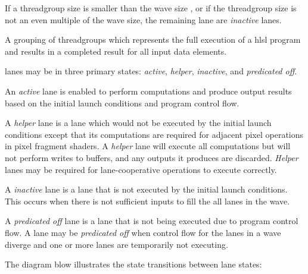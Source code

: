 \p If a \gls{threadgroup} size is smaller than the \gls{wave} size , or if the
\gls{threadgroup} size is not an even multiple of the \gls{wave} size, the
remaining \gls{lane} are \textit{inactive} \gls{lane}s.


\p A grouping of \gls{threadgroup}s which represents the full execution of a
\acrshort{hlsl} program and results in a completed result for all input data
elements.


\p \gls{lane}s may be in three primary states: \textit{active}, \textit{helper},
\textit{inactive}, and \textit{predicated off}.

\p An \textit{active} \gls{lane} is enabled to perform computations and produce
output results based on the initial launch conditions and program control flow.

\p A \textit{helper} \gls{lane} is a lane which would not be executed by the
initial launch conditions except that its computations are required for adjacent
pixel operations in pixel fragment shaders. A \textit{helper} \gls{lane} will
execute all computations but will not perform writes to buffers, and any outputs
it produces are discarded. \textit{Helper} lanes may be required for
\gls{lane}-cooperative operations to execute correctly.

\p A \textit{inactive} \gls{lane} is a lane that is not executed by the initial
launch conditions. This occurs when there is not sufficient inputs to fill the
all \gls{lane}s in the \gls{wave}.

\p A \textit{predicated off} \gls{lane} is a lane that is not being executed due
to program control flow. A \gls{lane} may be \textit{predicated off} when
control flow for the \gls{lane}s in a \gls{wave} diverge and one or more lanes
are temporarily not executing.

\p The diagram blow illustrates the state transitions between \gls{lane} states:


